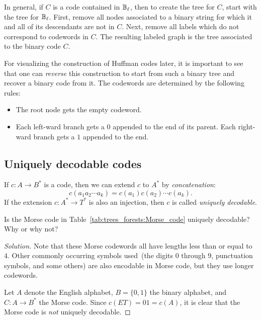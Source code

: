 In general, if $C$ is a code contained in $\mathbb{B}_\ell$, then to create
the tree for $C$, start with the tree for $\mathbb{B}_\ell$. First, remove
all nodes associated to a binary string for which it and all of its
descendants are not in $C$. Next, remove all labels which do not
correspond to codewords in $C$. The resulting labeled graph is the
tree associated to the binary code $C$.

For visualizing the construction of Huffman codes later, it is
important to see that one can \emph{reverse} this construction to
start from such a binary tree and recover a binary code from it. The
codewords are determined by the following rules:
%
\begin{itemize}
\item The root node gets the empty codeword.

\item Each left-ward branch gets a $0$ appended to the end of its
  parent. Each right-ward branch gets a $1$ appended to the end.
\end{itemize}



\subsection{Uniquely decodable codes}

If $c: A \longrightarrow B^*$ is a code, then we can extend $c$ to
$A^*$ by \emph{concatenation}:
\[
c(a_1 a_2 \cdots a_k)
=
c(a_1) c(a_2) \cdots c(a_k).
\]
If the extension $c: A^* \longrightarrow T^*$ is also an injection,
then $c$ is called \emph{uniquely decodable}.

\begin{example}
Is the Morse code in
Table~\ref{tab:trees_forests:Morse_code} uniquely decodable? Why or
why not?
\end{example}

\begin{proof}[Solution]
Note that these Morse codewords all have lengths less than or equal to
$4$. Other commonly occurring symbols used~(the digits $0$ through
$9$, punctuation symbols, and some others) are also encodable in Morse
code, but they use longer codewords.

Let $A$ denote the English alphabet, $B = \{0, 1\}$ the binary
alphabet, and $C: A \longrightarrow B^*$ the Morse code. Since
$c(ET) = 01 = c(A)$, it is clear that the Morse code is \emph{not}
uniquely decodable.
\end{proof}

